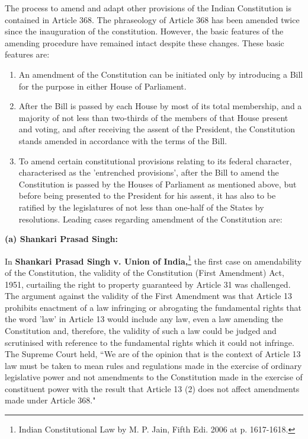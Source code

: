 \begin{multicols}{2}
\noi
The process to amend and adapt other provisions of the Indian Constitution is contained in Article
368. The phraseology of Article 368 has been amended twice since the inauguration of the
constitution. However, the basic features of the amending procedure have remained intact despite
these changes. These basic features are:

\begin{enumerate}[label=(\roman*)]
\item  An amendment of the Constitution can be initiated only by introducing a Bill for the purpose
in either House of Parliament.

\item After the Bill is passed by each House by most of its total membership, and a majority of not
less than two-thirds of the members of that House present and voting, and after receiving the
assent of the President, the Constitution stands amended in accordance with the terms of the Bill.

\item To amend certain constitutional provisions relating to its federal character, characterised as
the 'entrenched provisions', after the Bill to amend the Constitution is passed by the Houses of
Parliament as mentioned above, but before being presented to the President for his assent, it has
also to be ratified by the legislatures of not less than one-half of the States by resolutions. Leading
cases regarding amendment of the Constitution are:
\end{enumerate}

\noi
{\large \bfseries (a) Shankari Prasad Singh:}

\noi
In \textbf{Shankari Prasad Singh v. Union of India,}\footnote{Indian Constitutional Law by M. P. Jain, Fifth Edi. 2006 at p. 1617-1618.} the first case on amendability of the Constitution, the validity of the Constitution (First Amendment) Act, 1951, curtailing the right to property guaranteed by Article 31 was challenged. The argument against the validity of the First
Amendment was that Article 13 prohibits enactment of a law infringing or abrogating the
fundamental rights that the word 'law' in Article 13 would include any law, even a law amending
the Constitution and, therefore, the validity of such a law could be judged and scrutinised with
reference to the fundamental rights which it could not infringe. The Supreme Court held, “We are
of the opinion that is the context of Article 13 law must be taken to mean rules and regulations
made in the exercise of ordinary legislative power and not amendments to the Constitution made
in the exercise of constituent power with the result that Article 13 (2) does not affect amendments
made under Article 368."


\end{multicols}
